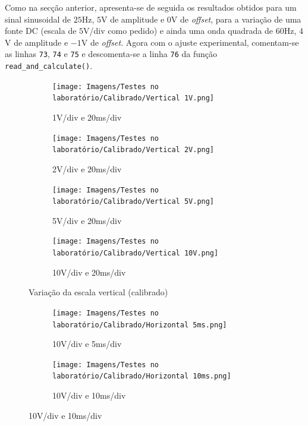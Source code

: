 Como na secção anterior, apresenta-se de seguida os resultados obtidos para um sinal sinusoidal de $25$Hz, $5$V de amplitude e $0$V de \textit{offset}, para a variação de uma fonte DC (escala de $5$V/div como pedido) e ainda uma onda quadrada de $60$Hz, $4$V de amplitude e $-1$V de \textit{offset}. Agora com o ajuste experimental, comentam-se as linhas \texttt{73}, \texttt{74} e \texttt{75} e descomenta-se a linha \texttt{76} da função \texttt{read\_and\_calculate()}.

\vspace{1.5cm}

\begin{figure}[H]
    \centering
    \begin{subfigure}{0.35\textwidth}
        \centering
        \texttt{[image: Imagens/Testes no laboratório/Calibrado/Vertical 1V.png]}
        \captionsetup{justification=centering}
        \caption{1V/div e 20ms/div}
        \label{fig:1V/div e 20ms/div calibrado}
    \end{subfigure}
    \begin{subfigure}{0.35\textwidth}
        \centering
        \texttt{[image: Imagens/Testes no laboratório/Calibrado/Vertical 2V.png]}
        \captionsetup{justification=centering}
        \caption{2V/div e 20ms/div}
        \label{fig:2V/div e 20ms/div calibrado}
    \end{subfigure}
    \begin{subfigure}{0.35\textwidth}
        \centering
        \texttt{[image: Imagens/Testes no laboratório/Calibrado/Vertical 5V.png]}
        \captionsetup{justification=centering}
        \caption{5V/div e 20ms/div}
        \label{fig:5V/div e 20ms/div calibrado}
    \end{subfigure}
    \begin{subfigure}{0.35\textwidth}
        \centering
        \texttt{[image: Imagens/Testes no laboratório/Calibrado/Vertical 10V.png]}
        \captionsetup{justification=centering}
        \caption{10V/div e 20ms/div}
        \label{fig:10V/div e 20ms/div vertical calibrado}
    \end{subfigure}
    \captionsetup{justification=centering}
    \caption{Variação da escala vertical (calibrado)}
    \label{fig:Variação da escala vertical (calibrado)}
\end{figure}

\begin{figure}[H]
    \centering
    \begin{subfigure}{0.35\textwidth}
        \centering
        \texttt{[image: Imagens/Testes no laboratório/Calibrado/Horizontal 5ms.png]}
        \captionsetup{justification=centering}
        \caption{10V/div e 5ms/div}
        \label{fig:10V/div e 5ms/div calibrado}
    \end{subfigure}
    \begin{subfigure}{0.35\textwidth}
        \centering
        \texttt{[image: Imagens/Testes no laboratório/Calibrado/Horizontal 10ms.png]}
        \captionsetup{justification=centering}
        \caption{10V/div e 10ms/div}
        \label{fig:10V/div e 10ms/div calibrado}
    \end{subfigure}
\end{figure}

